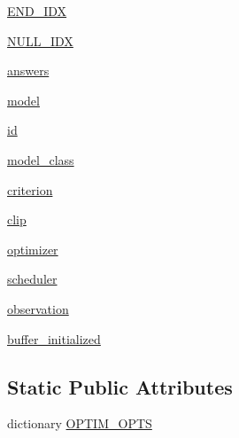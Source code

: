 \begin{DoxyCompactItemize}
\item 
\hyperlink{classparlai_1_1agents_1_1legacy__agents_1_1seq2seq_1_1seq2seq__v0_1_1Seq2seqAgent_a46ebee256e0812f6cab77a71c02578e0}{E\+N\+D\+\_\+\+I\+DX}
\item 
\hyperlink{classparlai_1_1agents_1_1legacy__agents_1_1seq2seq_1_1seq2seq__v0_1_1Seq2seqAgent_a8589f9403a5d358b1c58b467fc556680}{N\+U\+L\+L\+\_\+\+I\+DX}
\item 
\hyperlink{classparlai_1_1agents_1_1legacy__agents_1_1seq2seq_1_1seq2seq__v0_1_1Seq2seqAgent_ad5d4bdcd877577596273c4af1eb4c70d}{answers}
\item 
\hyperlink{classparlai_1_1agents_1_1legacy__agents_1_1seq2seq_1_1seq2seq__v0_1_1Seq2seqAgent_ae6ef958bb58cc1597b23b0a6c6c49b3f}{model}
\item 
\hyperlink{classparlai_1_1agents_1_1legacy__agents_1_1seq2seq_1_1seq2seq__v0_1_1Seq2seqAgent_a616955265cd96254aae5b5958ac18159}{id}
\item 
\hyperlink{classparlai_1_1agents_1_1legacy__agents_1_1seq2seq_1_1seq2seq__v0_1_1Seq2seqAgent_a203f77c92dd9f343cd7c5580756d5e5a}{model\+\_\+class}
\item 
\hyperlink{classparlai_1_1agents_1_1legacy__agents_1_1seq2seq_1_1seq2seq__v0_1_1Seq2seqAgent_ad336994a64a83591ba1388aef3f1d5de}{criterion}
\item 
\hyperlink{classparlai_1_1agents_1_1legacy__agents_1_1seq2seq_1_1seq2seq__v0_1_1Seq2seqAgent_a4896d5dc3fd7a0f876a654f0bc942b6a}{clip}
\item 
\hyperlink{classparlai_1_1agents_1_1legacy__agents_1_1seq2seq_1_1seq2seq__v0_1_1Seq2seqAgent_ac6a5cc3b1faaae160f5c10318a7afcfd}{optimizer}
\item 
\hyperlink{classparlai_1_1agents_1_1legacy__agents_1_1seq2seq_1_1seq2seq__v0_1_1Seq2seqAgent_ac8229fafe6c4b7d7ebedbd0f00b55eb0}{scheduler}
\item 
\hyperlink{classparlai_1_1agents_1_1legacy__agents_1_1seq2seq_1_1seq2seq__v0_1_1Seq2seqAgent_a4473b0e478d7928c2b59ab653c8334fb}{observation}
\item 
\hyperlink{classparlai_1_1agents_1_1legacy__agents_1_1seq2seq_1_1seq2seq__v0_1_1Seq2seqAgent_a31e1353ee2c64ac03af2bc7854597f35}{buffer\+\_\+initialized}
\end{DoxyCompactItemize}
\subsection*{Static Public Attributes}
\begin{DoxyCompactItemize}
\item 
dictionary \hyperlink{classparlai_1_1agents_1_1legacy__agents_1_1seq2seq_1_1seq2seq__v0_1_1Seq2seqAgent_a83374019847ffa0c1cc43bf0b24120e9}{O\+P\+T\+I\+M\+\_\+\+O\+P\+TS}
\end{DoxyCompactItemize}


